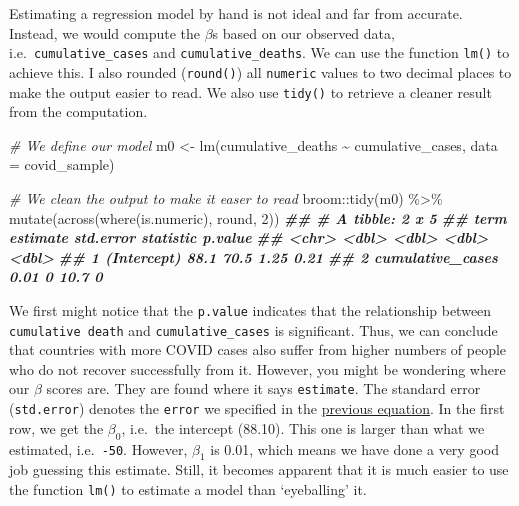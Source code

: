 \documentclass[
]{book}
\newenvironment{Shaded}{\begin{snugshade}}{\end{snugshade}}
\newcommand{\AttributeTok}[1]{\textcolor[rgb]{0.77,0.63,0.00}{#1}}
\newcommand{\CommentTok}[1]{\textcolor[rgb]{0.56,0.35,0.01}{\textit{#1}}}
\newcommand{\DecValTok}[1]{\textcolor[rgb]{0.00,0.00,0.81}{#1}}
\newcommand{\DocumentationTok}[1]{\textcolor[rgb]{0.56,0.35,0.01}{\textbf{\textit{#1}}}}
\newcommand{\FunctionTok}[1]{\textcolor[rgb]{0.00,0.00,0.00}{#1}}
\newcommand{\NormalTok}[1]{#1}
\newcommand{\OtherTok}[1]{\textcolor[rgb]{0.56,0.35,0.01}{#1}}
\newcommand{\SpecialCharTok}[1]{\textcolor[rgb]{0.00,0.00,0.00}{#1}}
\begin{document}
Estimating a regression model by hand is not ideal and far from accurate. Instead, we would compute the \(\beta\)s based on our observed data, i.e.~\texttt{cumulative\_cases} and \texttt{cumulative\_deaths}. We can use the function \texttt{lm()} to achieve this. I also rounded (\texttt{round()}) all \texttt{numeric} values to two decimal places to make the output easier to read. We also use \texttt{tidy()} to retrieve a cleaner result from the computation.

\begin{Shaded}
\begin{Highlighting}[]
\CommentTok{\# We define our model}
\NormalTok{m0 }\OtherTok{\textless{}{-}} \FunctionTok{lm}\NormalTok{(cumulative\_deaths }\SpecialCharTok{\textasciitilde{}}\NormalTok{ cumulative\_cases, }\AttributeTok{data =}\NormalTok{ covid\_sample)}

\CommentTok{\# We clean the output to make it easer to read}
\NormalTok{broom}\SpecialCharTok{::}\FunctionTok{tidy}\NormalTok{(m0) }\SpecialCharTok{\%\textgreater{}\%}
  \FunctionTok{mutate}\NormalTok{(}\FunctionTok{across}\NormalTok{(}\FunctionTok{where}\NormalTok{(is.numeric), round, }\DecValTok{2}\NormalTok{))}
\DocumentationTok{\#\# \# A tibble: 2 x 5}
\DocumentationTok{\#\#   term             estimate std.error statistic p.value}
\DocumentationTok{\#\#   \textless{}chr\textgreater{}               \textless{}dbl\textgreater{}     \textless{}dbl\textgreater{}     \textless{}dbl\textgreater{}   \textless{}dbl\textgreater{}}
\DocumentationTok{\#\# 1 (Intercept)         88.1       70.5      1.25    0.21}
\DocumentationTok{\#\# 2 cumulative\_cases     0.01       0       10.7     0}
\end{Highlighting}
\end{Shaded}

We first might notice that the \texttt{p.value} indicates that the relationship between \texttt{cumulative\ death} and \texttt{cumulative\_cases} is significant. Thus, we can conclude that countries with more COVID cases also suffer from higher numbers of people who do not recover successfully from it. However, you might be wondering where our \(\beta\) scores are. They are found where it says \texttt{estimate}. The standard error (\texttt{std.error}) denotes the \texttt{error} we specified in the \protect\hyperlink{single-linear-regression}{previous equation}. In the first row, we get the \(\beta_0\), i.e.~the intercept (88.10). This one is larger than what we estimated, i.e.~\texttt{-50}. However, \(\beta_1\) is 0.01, which means we have done a very good job guessing this estimate. Still, it becomes apparent that it is much easier to use the function \texttt{lm()} to estimate a model than `eyeballing' it.
\end{document}
